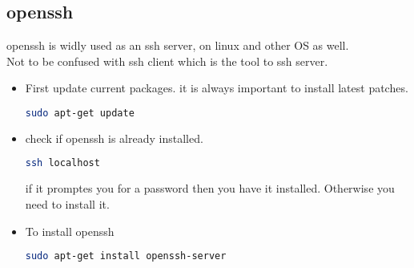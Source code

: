 \documentclass{book}
\begin{document}
\subsection{openssh}
openssh is widly used as an ssh server, on linux and other OS as well.\\
Not to be confused with ssh client which is the tool to ssh server.\\
\begin{itemize}
\item First update current packages. it is always important to install latest patches.
\begin{lstlisting}[language=bash]
sudo apt-get update
\end{lstlisting}
\item check if openssh is already installed.
\begin{lstlisting}[language=bash]
ssh localhost
\end{lstlisting}
if it promptes you for a password then you have it installed. Otherwise you need to install it.\\
\item To install openssh
\begin{lstlisting}[language=bash]
sudo apt-get install openssh-server
\end{lstlisting}

\end{itemize}
\end{document}
